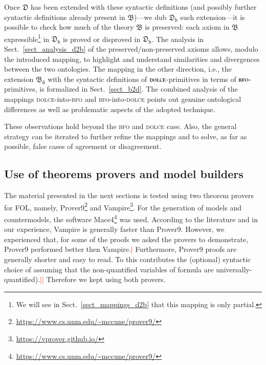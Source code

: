 \documentclass[ao]{iosart2x}
\newcommand{\nb}[1]{\textcolor{red}{$|$}\marginpar{\hspace*{-0cm}\parbox{20mm}{\scriptsize\raggedright\textcolor{red}{#1}}}}
\newcommand{\dolce}{{\textsc{dolce}}}
\newcommand{\bfo}{{\textsc{bfo}}}
\newcommand {\thdolce} {\ensuremath{\mathfrak{D}}}
\newcommand {\thbfo} {\ensuremath{\mathfrak{B}}}
\newcommand {\thbfobdmap} {\ensuremath{\mathfrak{B}_\texttt{d}}}
\newcommand {\thdolcedbmap} {\ensuremath{\mathfrak{D}_\texttt{b}}}
\begin{document}
Once {$\thdolce$} has been extended with these syntactic definitions (and possibly further syntactic definitions already present in {$\thbfo$})---we dub $\thdolcedbmap$ such extension---it is possible to check how much of the theory $\thbfo$ is preserved: each axiom in $\thbfo$ expressible\footnote{We will see in Sect.~\ref{sect_mappings_d2b} that this mapping is only partial.} in $\thdolcedbmap$ is proved or disproved in $\thdolcedbmap$. The analysis in Sect.~\ref{sect_analysis_d2b} of the preserved/non-preserved axioms allows, modulo the introduced mapping, to highlight and understand similarities and divergences between the two ontologies. The mapping in the other direction, i.e., the extension $\thbfobdmap$ with the syntactic definitions of {$\dolce$}-primitives in terms of {$\bfo$}-primitives, is formalized in Sect.~\ref{sect_b2d}. The combined analysis of the mappings {\dolce}-into-{\bfo} and {\bfo}-into-{\dolce} points out genuine ontological differences as well as problematic aspects of the adopted technique. 

These observations hold beyond the {\bfo} and {\dolce} case. Also, the general strategy can be iterated to further refine the mappings and to solve, as far as possible, false cases of agreement or disagreement.

\subsection{Use of theorems provers and model builders}

The material presented in the next sections is tested using two theorem provers for FOL, namely, Prover9\footnote{\url{https://www.cs.unm.edu/~mccune/prover9/}} and Vampire\footnote{\url{https://vprover.github.io/}}. For the generation of models and countermodels, the software Mace4\footnote{\url{https://www.cs.unm.edu/~mccune/prover9/}} was used.
According to the literature \citep{Sut16} and in our experience, Vampire is generally faster than Prover9. However, we experienced that, for some of the proofs we asked the provers to demonstrate, Prover9 performed better then Vampire.\nb{CM: @Francesco, forse spiegare meglio in che senso è meglio FC:riscritto} Furthermore, Prover9 proofs are generally shorter and easy to read. To this contributes the (optional) syntactic choice of assuming that the non-quantified variables of formula are universally-quantified).\nb{CM: non sono sicuro di capire, nel senso che non si riportano i quantificatore per le variabili univ. quantificate? FC: riscritto}\nb{SB: ho indebolito, da ricontrollare} Therefore we kept using both provers. 
\end{document}
